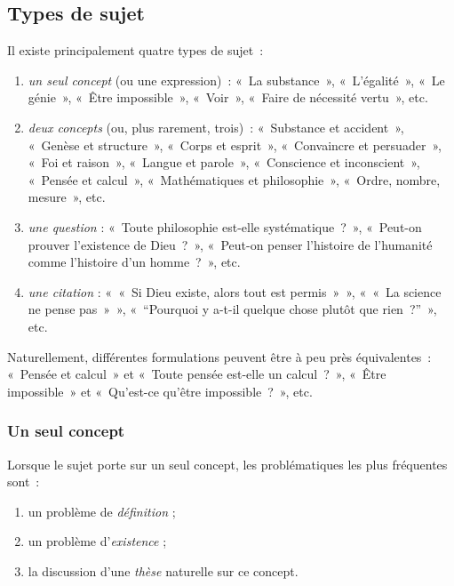 \documentclass[a4paper,12pt]{article}
\begin{document}
\subsection{Types de sujet}
\label{sec-2-3}

Il existe principalement quatre types de sujet :

\begin{enumerate}
\item \emph{un seul concept} (ou une expression) : « La substance », « L'égalité »,
« Le génie », « Être impossible », « Voir », « Faire de nécessité vertu »,
etc.

\item \emph{deux concepts} (ou, plus rarement, trois) : « Substance et
accident », « Genèse et structure », « Corps et esprit »,
« Convaincre et persuader », « Foi et raison », « Langue et parole »,
« Conscience et inconscient », « Pensée et calcul », « Mathématiques
et philosophie », « Ordre, nombre, mesure », etc.

\item \emph{une question} : « Toute philosophie est-elle systématique ? »,
« Peut-on prouver l'existence de Dieu ? », « Peut-on penser l'histoire
de l'humanité comme l'histoire d'un homme ? », etc.

\item \emph{une citation} : « « Si Dieu existe, alors tout est permis » »,
« « La science ne pense pas » », « ``Pourquoi y a-t-il quelque chose
plutôt que rien ?'' », etc.
\end{enumerate}

Naturellement, différentes formulations peuvent être à peu près
équivalentes : « Pensée et calcul » et « Toute pensée est-elle un
calcul ? », « Être impossible » et « Qu'est-ce qu'être impossible ? », etc.

\subsubsection{Un seul concept}
\label{sec-2-3-1}

Lorsque le sujet porte sur un seul concept, les problématiques les plus
fréquentes sont :

\begin{enumerate}
\item un problème de \emph{définition} ;

\item un problème d'\emph{existence} ;

\item la discussion d'une \emph{thèse} naturelle sur ce concept.
\end{enumerate}
\end{document}
